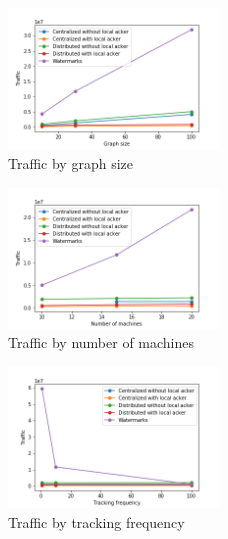 \begin{figure}[htbp]
  \centering
  \includegraphics[width=0.50\textwidth]{pics/traffic_by_graph_size.png}
  \caption{Traffic by graph size}
\end{figure}
\begin{figure}[htbp]
  \centering
  \includegraphics[width=0.50\textwidth]{pics/traffic_by_number_of_machines.png}
  \caption{Traffic by number of machines}
\end{figure}
\begin{figure}[htbp]
  \centering
  \includegraphics[width=0.50\textwidth]{pics/traffic_by_tracking_frequency.png}
  \caption{Traffic by tracking frequency}
\end{figure}

